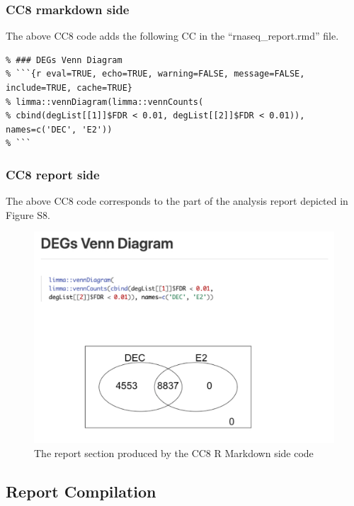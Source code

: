\documentclass[
]{article}
\begin{document}
\hypertarget{cc8-rmarkdown-side}{%
\subsubsection{CC8 rmarkdown side}\label{cc8-rmarkdown-side}}

The above CC8 code adds the following CC in the ``rnaseq\_report.rmd''
file.

\begin{verbatim}
% ### DEGs Venn Diagram
% ```{r eval=TRUE, echo=TRUE, warning=FALSE, message=FALSE, include=TRUE, cache=TRUE}
% limma::vennDiagram(limma::vennCounts(
% cbind(degList[[1]]$FDR < 0.01, degList[[2]]$FDR < 0.01)), names=c('DEC', 'E2'))
% ```
\end{verbatim}

\hypertarget{cc8-report-side}{%
\subsubsection{CC8 report side}\label{cc8-report-side}}

The above CC8 code corresponds to the part of the analysis report
depicted in Figure S8.

\begin{figure}[ht]

{\centering \includegraphics[width=0.95\linewidth]{imgs/8} 

}

\caption{The report section produced by the CC8 R Markdown side code}\label{fig:unnamed-chunk-18}
\end{figure}

\hypertarget{report-compilation}{%
\subsection{Report Compilation}\label{report-compilation}}
\end{document}
